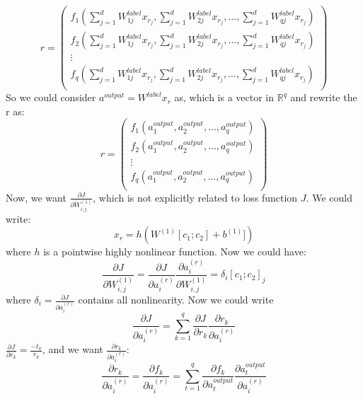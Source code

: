 \documentclass[twoside,12pt]{article}
\begin{document}
\begin{equation}
r =
\begin{pmatrix}
  f_1(\sum_{j=1}^{d}W^{label}_{1j} x_{r_j}, \sum_{j=1}^{d}W^{label}_{2j}x_{r_j},\ldots, \sum_{j=1}^{d}W^{label}_{qj}x_{r_j})\\
   f_2(\sum_{j=1}^{d}W^{label}_{1j}x_{r_j}, \sum_{j=1}^{d}W^{label}_{2j}x_{r_j},\ldots, \sum_{j=1}^{d}W^{label}_{qj}x_{r_j}) \\
  \vdots  \\
    f_q(\sum_{j=1}^{d}W^{label}_{1j}x_{r_j}, \sum_{j=1}^{d}W^{label}_{2j}x_{r_j},\ldots, \sum_{j=1}^{d}W^{label}_{qj}x_{r_j})\\
 \end{pmatrix}
\end{equation}
 So we could consider $a^{output}=W^{label}x_r$ as, which is a vector in $\mathbb{R}^q$ and rewrite the r as:
 \begin{equation}
 r=
 \begin{pmatrix}
 f_1(a^{output}_1,a^{output}_2,\ldots,a^{output}_q)\\
  f_2(a^{output}_1,a^{output}_2,\ldots,a^{output}_q)\\
\vdots \\
 f_q(a^{output}_1,a^{output}_2,\ldots,a^{output}_q)\\
 \end{pmatrix}
\end{equation}
Now, we want $\frac{\partial J}{\partial W^{(1)}_{i,j}}$, which is not explicitly related to loss function $J$. We could write:
\begin{equation}
x_r=h(W^{(1)}[c_1;c_2]+b^{(1)}])
\end{equation} 
where $h$ is a pointwise highly nonlinear function. Now we could have:
\begin{equation}
\frac{\partial J}{\partial W^{(1)}_{i,j}}=\frac{\partial J}{\partial a^{(r)}_i}\frac{\partial a^{(r)}_i}{\partial W^{(1)}_{i,j}}=\delta_i [c_1;c_2]_j
\end{equation}
where $\delta_i=\frac{\partial J}{\partial a^{(r)}_i}$ contains all nonlinearity. Now we could write
\begin{equation}
\frac{\partial J}{\partial a^{(r)}_i}= \sum_{k=1}^q\frac{\partial J}{\partial r_k}\frac{\partial r_k}{\partial a^{(r)}_i}
\end{equation}
$\frac{\partial J}{\partial r_k}=\frac{-t_k}{r_k}$, and we want $\frac{\partial r_k}{\partial a^{(r)}_i}$:
\begin{equation}
\frac{\partial r_k}{\partial a^{(r)}_i}=\frac{\partial f_k}{\partial a^{(r)}_i}=\sum_{t=1}^{q}\frac{\partial f_k}{\partial a^{output}_{t}}\frac{\partial a^{output}_t}{\partial a^{(r)}_i}
\end{equation}
\end{document}
